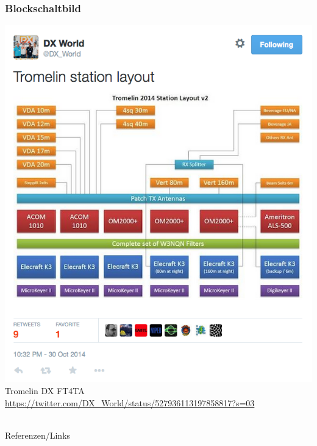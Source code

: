 \begin{frame}
  \frametitle{Blockschaltbild}
  \begin{center}
    \includegraphics[width=\textwidth,height=0.8\textheight,keepaspectratio]{a19/BsB.png}\\
    {\tiny Tromelin DX FT4TA \url{https://twitter.com/DX_World/status/527936113197858817?s=03}}
  \end{center}
\end{frame}

\renewcommand{\refname}{Referenzen}

\hypertarget{refs}{}
\textcolor{white}{} \\ %
\Large Referenzen/Links
\footnotesize

